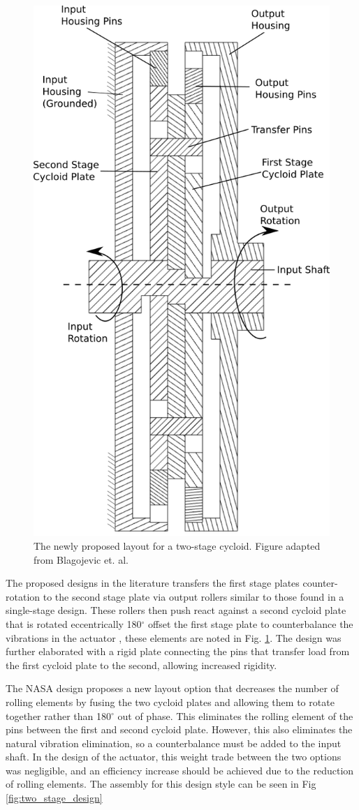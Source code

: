\begin{figure}[!b]
	\centering
	\includegraphics[width=0.48\linewidth]{fig/new_layout}
   \caption{The newly proposed layout for a two-stage cycloid. Figure adapted from Blagojevic et. al. \cite{ref:new_two_stage}}
   \label{fig:two_stage_simple_cross}
\end{figure}

The proposed designs in the literature transfers the first stage plates counter-rotation to the second stage plate via output rollers similar to those found in a single-stage design. These rollers then push react against a second cycloid plate that is rotated eccentrically 180$^\circ$ offset the first stage plate to counterbalance the vibrations in the actuator \cite{ref:new_two_stage}, these elements are noted in Fig. \ref{fig:two_stage_simple_cross}. The design was further elaborated with a rigid plate connecting the pins that transfer load from the first cycloid plate to the second, allowing increased rigidity. 

The NASA design proposes a new layout option that decreases the number of rolling elements by fusing the two cycloid plates and allowing them to rotate together rather than 180$^\circ$ out of phase. This eliminates the rolling element of the pins between the first and second cycloid plate. However, this also eliminates the natural vibration elimination, so a counterbalance must be added to the input shaft. In the design of the actuator, this weight trade between the two options was negligible, and an efficiency increase should be achieved due to the reduction of rolling elements. The assembly for this design style can be seen in Fig \ref{fig:two_stage_design} 

